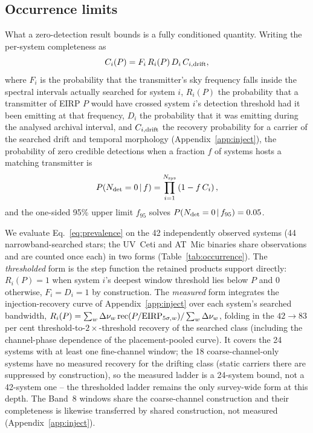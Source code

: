 \documentclass{openjournal}
\begin{document}
\subsection{Occurrence limits}

What a zero-detection result bounds is a fully conditioned quantity.
Writing the per-system completeness as
\begin{equation}
C_i(P) = F_i\,R_i(P)\,D_i\,C_{i,\rm drift},
\label{eq:conditioning}
\end{equation}
where $F_i$ is the probability that the transmitter's sky frequency
falls inside the spectral intervals actually searched for system $i$,
$R_i(P)$ the probability that a transmitter of EIRP $P$ would have
crossed system $i$'s detection threshold had it been emitting at that
frequency, $D_i$ the probability that it was emitting during the analysed
archival interval, and $C_{i,\rm drift}$ the recovery probability for
a carrier of the searched drift and temporal morphology
(Appendix~\ref{app:inject}), the probability of zero credible
detections when a fraction $f$ of systems hosts a matching
transmitter is
\begin{equation}
P(N_{\rm det}=0\,|\,f)=\prod_{i=1}^{N_{\rm sys}}\left(1-f\,C_i\right),
\label{eq:prevalence}
\end{equation}
and the one-sided 95\% upper limit $f_{95}$ solves
$P(N_{\rm det}=0\,|\,f_{95})=0.05$.

\noindent{}

\noindent We evaluate Eq.~\ref{eq:prevalence} on the 42 independently
observed systems (44 narrowband-searched stars; the UV~Ceti and
AT~Mic binaries share observations and are counted once each) in two
forms (Table~\ref{tab:occurrence}). The \emph{thresholded} form is
the step function the retained products support directly: $R_i(P)=1$
when system $i$'s deepest window threshold lies below $P$ and 0
otherwise, $F_i=D_i=1$ by construction. The \emph{measured} form
integrates the injection-recovery curve of Appendix~\ref{app:inject}
over each system's searched bandwidth,
$R_i(P) = \sum_w \Delta\nu_w\, {\rm rec}(P/{\rm
EIRP}_{5\sigma,w}) / \sum_w \Delta\nu_w$, folding in the
$42\rightarrow83$ per cent threshold-to-$2\times$-threshold recovery
of the searched class (including the channel-phase dependence of
the placement-pooled curve). It covers the 24 systems with at
least one fine-channel window; the 18 coarse-channel-only systems
have no measured recovery for the drifting class (static carriers
there are suppressed by construction), so the measured ladder is a
24-system bound, not a 42-system one -- the thresholded ladder
remains the only survey-wide form at this depth. The Band~8 windows
share the coarse-channel construction and their completeness is
likewise transferred by shared construction, not measured
(Appendix~\ref{app:inject}).
\end{document}

